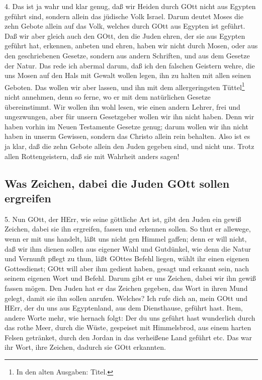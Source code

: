 4. Das ist ja wahr und klar genug, daß wir Heiden durch GOtt nicht aus Egypten geführt sind, sondern allein das jüdische Volk Israel. Darum deutet Moses die zehn Gebote allein auf das Volk, welches durch GOtt aus Egypten ist geführt. Daß wir aber gleich auch den GOtt, den die Juden ehren, der sie aus Egypten geführt hat, erkennen, anbeten und ehren, haben wir nicht durch Mosen, oder aus den geschriebenen Gesetze, sondern aus andern Schriften, und aus dem Gesetze der Natur. Das rede ich
abermal darum, daß ich den falschen Geistern wehre, die uns Mosen auf den Hals mit Gewalt wollen legen, ihn zu halten mit allen seinen Geboten. Das wollen wir aber lassen, und ihn mit dem allergeringsten Tüttel\footnote{In den alten Ausgaben: Titel.} nicht annehmen, denn so ferne, wo er mit dem natürlichen Gesetze übereinstimmt. Wir wollen ihn wohl lesen, wie einen andern Lehrer, frei und ungezwungen, aber für unsern Gesetzgeber wollen wir ihn nicht haben. Denn wir haben vorhin im Neuen Testamente Gesetze genug; darum wollen wir ihn nicht haben in unserm Gewissen, sondern das Christo allein rein behalten. Also ist es ja klar, daß die zehn Gebote allein den Juden gegeben sind, und nicht uns. Trotz allen Rottengeistern, daß sie mit Wahrheit anders sagen!

\subsection{Was Zeichen, dabei die Juden GOtt sollen ergreifen}

5. Nun GOtt, der HErr, wie seine göttliche Art ist, gibt den Juden ein gewiß Zeichen, dabei sie ihn ergreifen, fassen und erkennen sollen. So thut er allewege, wenn er mit uns handelt, läßt uns nicht gen Himmel gaffen; denn er will nicht, daß wir ihm dienen sollen aus eigener Wahl und Gutdünkel, wie denn die Natur und Vernunft pflegt zu thun, läßt GOttes Befehl liegen, wählt ihr einen eigenen Gottesdienst; GOtt will aber ihm gedient haben, gesagt und erkannt sein, nach seinem eigenen Wort und Befehl. Darum gibt er uns Zeichen, dabei wir ihn gewiß fassen mögen. Den Juden hat er das Zeichen gegeben, das Wort in ihren Mund gelegt, damit sie ihn sollen anrufen. Welches? Ich rufe dich an, mein GOtt und HErr, der du uns aus Egyptenland, aus dem Diensthause, geführt hast. Item, andere Worte mehr, wie hernach folgt: Der du uns geführt hast wunderlich durch das rothe Meer, durch die Wüste, gespeiset mit Himmelsbrod, aus einem harten Felsen getränket, durch den Jordan in das verheißene Land geführt etc. Das war ihr Wort, ihre Zeichen, dadurch sie GOtt erkannten.

